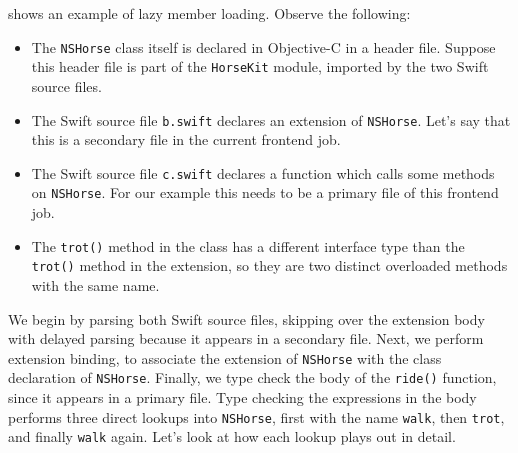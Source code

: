 \documentclass[../generics]{subfiles}
\begin{document}
\begin{example}
 shows an example of lazy member loading. Observe the following:
\begin{itemize}
\item The \texttt{NSHorse} class itself is declared in Objective-C in a header file. Suppose this header file is part of the \texttt{HorseKit} module, imported by the two Swift source files.
\item The Swift source file \texttt{b.swift} declares an extension of \texttt{NSHorse}. Let's say that this is a secondary file in the current frontend job.
\item The Swift source file \texttt{c.swift} declares a function which calls some methods on \texttt{NSHorse}. For our example this needs to be a primary file of this frontend job.
\item The \texttt{trot()} method in the class has a different interface type than the \texttt{trot()} method in the extension, so they are two distinct overloaded methods with the same name.
\end{itemize}
We begin by parsing both Swift source files, skipping over the extension body with delayed parsing because it appears in a secondary file. Next, we perform extension binding, to associate the extension of \texttt{NSHorse} with the class declaration of \texttt{NSHorse}. Finally, we type check the body of the \texttt{ride()} function, since it appears in a primary file. Type checking the expressions in the body performs three direct lookups into \texttt{NSHorse}, first with the name \texttt{walk}, then \texttt{trot}, and finally \texttt{walk} again. Let's look at how each lookup plays out in detail.

\newcommand{\LookupTableEntry}[1]{{\setlength{\fboxrule}{0pt}\fbox{\begin{tabular}{@{}l@{}}#1\end{tabular}}}}

\newcommand{\LookupTableElt}[1]{
\begin{tikzpicture}
\node [rounded corners, fill=light-gray] {#1};
\end{tikzpicture}
}

\smallskip


\end{example}
\end{document}
